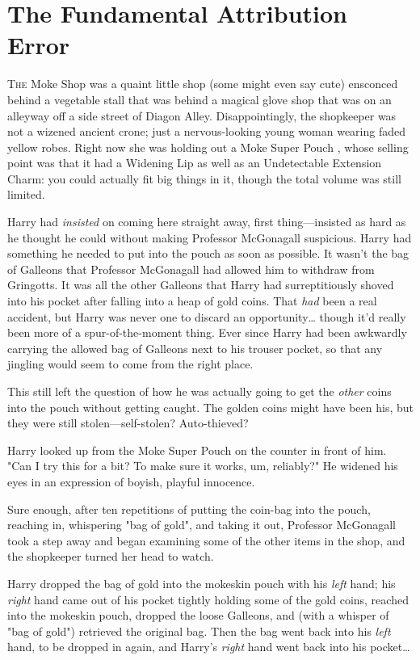 \chapter{The Fundamental Attribution Error}

\lettrine{T}{he} Moke Shop was a quaint little shop (some might even say cute) ensconced
behind a vegetable stall that was behind a magical glove shop that was on an
alleyway off a side street of Diagon Alley. Disappointingly, the shopkeeper was
not a wizened ancient crone; just a nervous-looking young woman wearing faded
yellow robes. Right now she was holding out a Moke Super Pouch , whose
selling point was that it had a Widening Lip as well as an Undetectable
Extension Charm: you could actually fit big things in it, though the total
volume was still limited.

Harry had \emph{insisted} on coming here straight away, first thing---insisted
as hard as he thought he could without making Professor McGonagall suspicious.
Harry had something he needed to put into the pouch as soon as possible. It
wasn't the bag of Galleons that Professor McGonagall had allowed him to
withdraw from Gringotts. It was all the other Galleons that Harry had
surreptitiously shoved into his pocket after falling into a heap of gold coins.
That \emph{had} been a real accident, but Harry was never one to discard an
opportunity{\ldots} though it'd really been more of a spur-of-the-moment thing.
Ever since Harry had been awkwardly carrying the allowed bag of Galleons next
to his trouser pocket, so that any jingling would seem to come from the right
place.

This still left the question of how he was actually going to get the
\emph{other} coins into the pouch without getting caught. The golden coins
might have been his, but they were still stolen---self-stolen? Auto-thieved?

Harry looked up from the Moke Super Pouch  on the counter in front of him.
"Can I try this for a bit? To make sure it works, um, reliably?" He widened his
eyes in an expression of boyish, playful innocence.

Sure enough, after ten repetitions of putting the coin-bag into the pouch,
reaching in, whispering "bag of gold", and taking it out, Professor McGonagall
took a step away and began examining some of the other items in the shop, and
the shopkeeper turned her head to watch.

Harry dropped the bag of gold into the mokeskin pouch with his \emph{left}
hand; his \emph{right} hand came out of his pocket tightly holding some of the
gold coins, reached into the mokeskin pouch, dropped the loose Galleons, and
(with a whisper of "bag of gold") retrieved the original bag. Then the bag went
back into his \emph{left} hand, to be dropped in again, and Harry's
\emph{right} hand went back into his pocket{\ldots}

